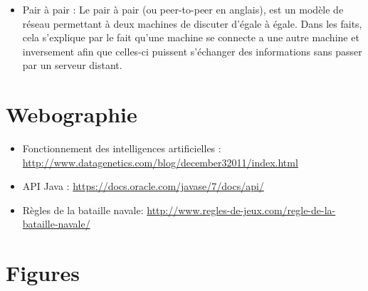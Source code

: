 \begin{itemize}
\item Pair à  pair :
    Le pair à  pair (ou peer-to-peer en anglais), est un modèle de réseau permettant à  deux machines de discuter d'égale à  égale.
    Dans les faits, cela s'explique par le fait qu'une machine se connecte a une autre machine et inversement afin que celles-ci puissent s'échanger des informations
    sans passer par un serveur distant.
\end{itemize}


\newpage
\section{Webographie}
\begin{itemize}
	\item Fonctionnement des intelligences artificielles : \url{http://www.datagenetics.com/blog/december32011/index.html}
\newline	
	\item API Java : \url{https://docs.oracle.com/javase/7/docs/api/}
	\newline
	\item Règles de la bataille navale: \url{http://www.regles-de-jeux.com/regle-de-la-bataille-navale/}
\end{itemize}

\section{Figures}
